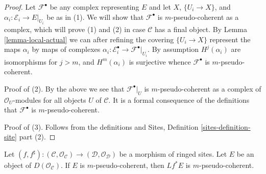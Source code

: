 \begin{proof}
Let $\mathcal{F}^\bullet$ be any complex representing $E$
and let $X$, $\{U_i \to X\}$, and $\alpha_i : \mathcal{E}_i \to E|_{U_i}$
be as in (1). We will show that $\mathcal{F}^\bullet$ is $m$-pseudo-coherent
as a complex, which will prove (1) and (2) in case $\mathcal{C}$ has a
final object. By Lemma \ref{lemma-local-actual}
we can after refining the covering $\{U_i \to X\}$
represent the maps $\alpha_i$ by maps of complexes
$\alpha_i : \mathcal{E}_i^\bullet \to \mathcal{F}^\bullet|_{U_i}$.
By assumption
$H^j(\alpha_i)$ are isomorphisms for $j > m$, and $H^m(\alpha_i)$
is surjective whence $\mathcal{F}^\bullet$ is
$m$-pseudo-coherent.

\medskip\noindent
Proof of (2). By the above we see that $\mathcal{F}^\bullet|_U$ is
$m$-pseudo-coherent as a complex of $\mathcal{O}_U$-modules for all
objects $U$ of $\mathcal{C}$. It is a formal consequence of the definitions
that $\mathcal{F}^\bullet$ is $m$-pseudo-coherent.

\medskip\noindent
Proof of (3). Follows from the definitions and
Sites, Definition \ref{sites-definition-site} part (2).
\end{proof}

\begin{lemma}
\label{lemma-pseudo-coherent-pullback}
Let $(f, f^\sharp) : (\mathcal{C}, \mathcal{O}_\mathcal{C}) \to
(\mathcal{D}, \mathcal{O}_\mathcal{D})$
be a morphism of ringed sites. Let $E$ be an object of
$D(\mathcal{O}_\mathcal{C})$. If $E$ is $m$-pseudo-coherent,
then $Lf^*E$ is $m$-pseudo-coherent.
\end{lemma}

